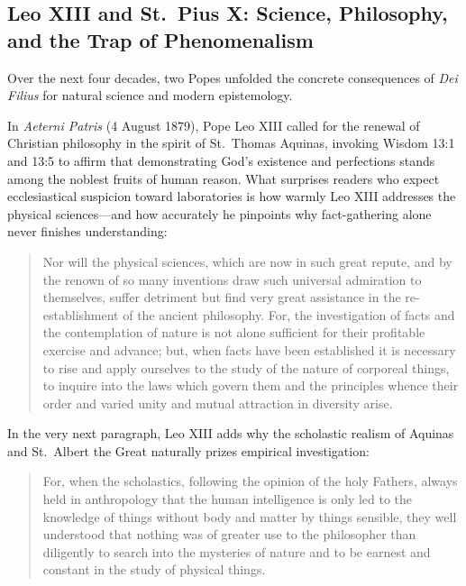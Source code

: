 \subsection{Leo XIII and St.\ Pius X: Science, Philosophy, and the Trap of Phenomenalism}

Over the next four decades, two Popes unfolded the concrete consequences of \emph{Dei Filius} for natural science and modern epistemology.

In \emph{Aeterni Patris} (4 August 1879), Pope Leo XIII called for the renewal of Christian philosophy in the spirit of St.\ Thomas Aquinas, invoking Wisdom 13:1 and 13:5 to affirm that demonstrating God's existence and perfections stands among the noblest fruits of human reason. What surprises readers who expect ecclesiastical suspicion toward laboratories is how warmly Leo XIII addresses the physical sciences---and how accurately he pinpoints why fact-gathering alone never finishes understanding:

\begin{quote}
Nor will the physical sciences, which are now in such great repute, and by the renown of so many inventions draw such universal admiration to themselves, suffer detriment but find very great assistance in the re-establishment of the ancient philosophy. For, the investigation of facts and the contemplation of nature is not alone sufficient for their profitable exercise and advance; but, when facts have been established it is necessary to rise and apply ourselves to the study of the nature of corporeal things, to inquire into the laws which govern them and the principles whence their order and varied unity and mutual attraction in diversity arise.
\end{quote}

In the very next paragraph, Leo XIII adds why the scholastic realism of Aquinas and St.\ Albert the Great naturally prizes empirical investigation:

\begin{quote}
For, when the scholastics, following the opinion of the holy Fathers, always held in anthropology that the human intelligence is only led to the knowledge of things without body and matter by things sensible, they well understood that nothing was of greater use to the philosopher than diligently to search into the mysteries of nature and to be earnest and constant in the study of physical things.
\end{quote}

